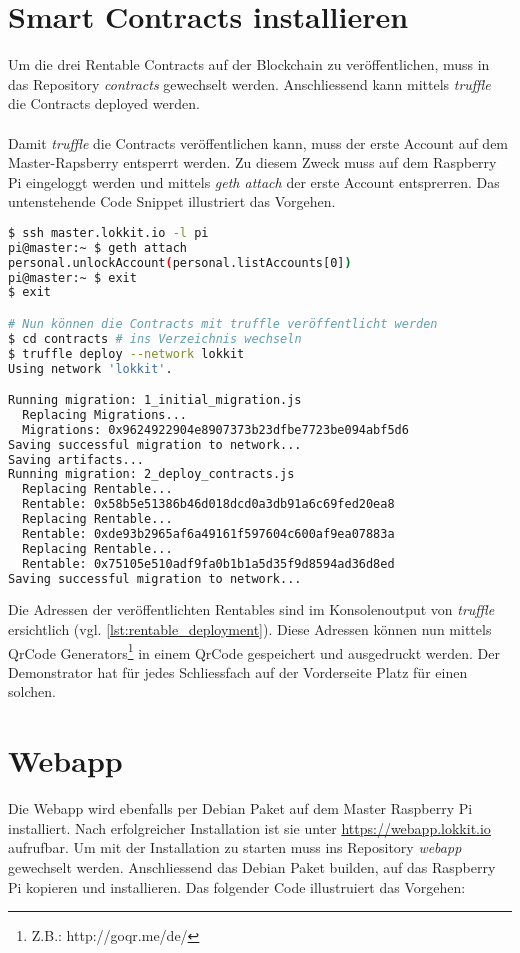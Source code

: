 \section{Smart Contracts installieren}
Um die drei Rentable Contracts auf der Blockchain zu veröffentlichen, muss in das Repository \emph{contracts} gewechselt werden. Anschliessend kann mittels \emph{truffle} die Contracts deployed werden. 

\paragraph{}
Damit \emph{truffle} die Contracts veröffentlichen kann, muss der erste Account auf dem Master-Rapsberry entsperrt werden. Zu diesem Zweck muss auf dem Raspberry Pi eingeloggt werden und mittels \emph{geth attach} der erste Account entsprerren. Das untenstehende Code Snippet illustriert das Vorgehen. 

\begin{lstlisting}[language=bash,label={lst:rentable_deployment},caption={Deployment der Contracts}]
$ ssh master.lokkit.io -l pi 
pi@master:~ $ geth attach
personal.unlockAccount(personal.listAccounts[0])
pi@master:~ $ exit
$ exit

# Nun können die Contracts mit truffle veröffentlicht werden
$ cd contracts # ins Verzeichnis wechseln
$ truffle deploy --network lokkit
Using network 'lokkit'.

Running migration: 1_initial_migration.js
  Replacing Migrations...
  Migrations: 0x9624922904e8907373b23dfbe7723be094abf5d6
Saving successful migration to network...
Saving artifacts...
Running migration: 2_deploy_contracts.js
  Replacing Rentable...
  Rentable: 0x58b5e51386b46d018dcd0a3db91a6c69fed20ea8
  Replacing Rentable...
  Rentable: 0xde93b2965af6a49161f597604c600af9ea07883a
  Replacing Rentable...
  Rentable: 0x75105e510adf9fa0b1b1a5d35f9d8594ad36d8ed
Saving successful migration to network...
\end{lstlisting}

\noindent 
Die Adressen der veröffentlichten Rentables sind im Konsolenoutput von \emph{truffle} ersichtlich (vgl. \ref{lst:rentable_deployment}). Diese Adressen können nun mittels QrCode Generators\footnote{Z.B.: http://goqr.me/de/} in einem QrCode gespeichert und ausgedruckt werden. Der Demonstrator hat für jedes Schliessfach auf der Vorderseite Platz für einen solchen.

\section{Webapp}
Die Webapp wird ebenfalls per Debian Paket auf dem Master Raspberry Pi installiert. Nach erfolgreicher Installation ist sie unter \url{https://webapp.lokkit.io} aufrufbar. Um mit der Installation zu starten muss ins Repository \emph{webapp} gewechselt werden. Anschliessend das Debian Paket builden, auf das Raspberry Pi kopieren und installieren. Das folgender Code illustruiert das Vorgehen:

